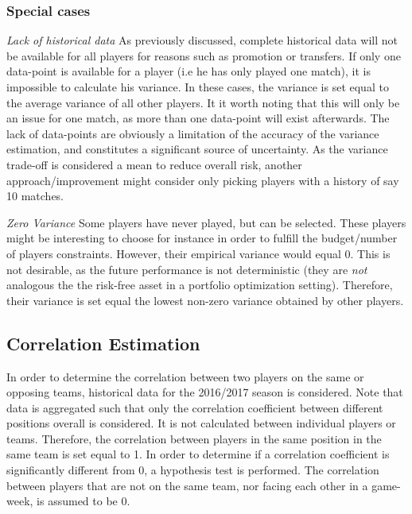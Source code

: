 \subsubsection{Special cases}
\textit{Lack of historical data}\newline
As previously discussed, complete historical data will not be available for all players for reasons such as promotion or transfers. If only one data-point is available for a player (i.e he has only played one match), it is impossible to calculate his variance. In these cases, the variance is set equal to the average variance of all other players. It it worth noting that this will only be an issue for one match, as more than one data-point will exist afterwards. The lack of data-points are obviously a limitation of the accuracy of the variance estimation, and constitutes a significant source of uncertainty. As the variance trade-off is considered a mean to reduce overall risk, another approach/improvement might consider only picking players with a history of say 10 matches. \newpar

\textit{Zero Variance}\newline
Some players have never played, but can be selected. These players might be interesting to choose for instance in order to fulfill the budget/number of players constraints. However, their empirical variance would equal 0. This is not desirable, as the future performance is not deterministic (they are \textit{not} analogous the the risk-free asset in a portfolio optimization setting). Therefore, their variance is set equal the lowest non-zero variance obtained by other players.

\subsection{Correlation Estimation}

In order to determine the correlation between two players on the same or opposing teams, historical data for the 2016/2017 season is considered. Note that data is aggregated such that only the correlation coefficient between different positions overall is considered. It is not calculated between individual players or teams. Therefore, the correlation between players in the same position in the same team is set equal to 1. In order to determine if a correlation coefficient is significantly different from 0, a hypothesis test is performed. The correlation between players that are not on the same team, nor facing each other in a game-week, is assumed to be 0.\newpar

